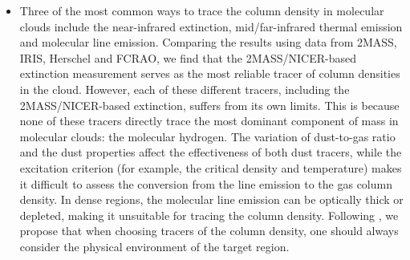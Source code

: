 \documentclass[11pt,a4paper]{emulateapj}
\begin{document}
\begin{itemize}
\item Three of the most common ways to trace the column density in molecular clouds include the near-infrared extinction, mid/far-infrared thermal emission and molecular line emission. Comparing the results using data from 2MASS, IRIS, Herschel and FCRAO, we find that the 2MASS/NICER-based extinction measurement serves as the most reliable tracer of column densities in the cloud. However, each of these different tracers, including the 2MASS/NICER-based extinction, suffers from its own limits. This is because none of these tracers directly trace the most dominant component of mass in molecular clouds: the molecular hydrogen. The variation of dust-to-gas ratio and the dust properties affect the effectiveness of both dust tracers, while the excitation criterion (for example, the critical density and temperature) makes it difficult to assess the conversion from the line emission to the gas column density. In dense regions, the molecular line emission can be optically thick or depleted, making it unsuitable for tracing the column density. Following \citet{Goodman_2009}, we propose that when choosing tracers of the column density, one should always consider the physical environment of the target region. 

\end{itemize}
\end{document}
